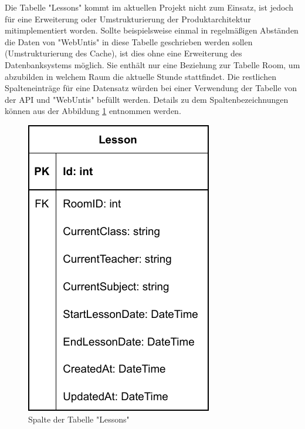 
Die Tabelle "Lessons" kommt im aktuellen Projekt nicht zum Einsatz, ist jedoch für eine Erweiterung oder Umstrukturierung der Produktarchitektur mitimplementiert worden. Sollte beispielsweise einmal in regelmäßigen Abständen die Daten von "WebUntis" in diese Tabelle geschrieben werden sollen (Umstrukturierung des Cache), ist dies ohne eine Erweiterung des Datenbanksystems möglich. Sie enthält nur eine Beziehung zur Tabelle Room, um abzubilden in welchem Raum die aktuelle Stunde stattfindet. Die restlichen Spalteneinträge für eine Datensatz würden bei einer Verwendung der Tabelle von der API und "WebUntis" befüllt werden. Details zu dem Spaltenbezeichnungen können aus der Abbildung \ref{fig:LessonColls} entnommen werden.

\begin{figure}[H]
    \centering
    \includegraphics{media/MariaDB/Lesson.svg.pdf}
    \caption{Spalte der Tabelle "Lessons"}
    \label{fig:LessonColls}
\end{figure}
